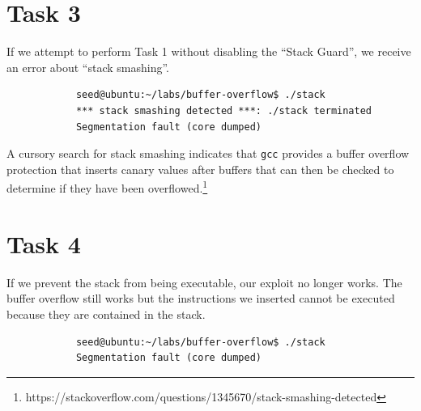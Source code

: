 \documentclass[12pt,letterpaper]{article}
\begin{document}
	\section*{Task 3}
		If we attempt to perform Task 1 without disabling the ``Stack Guard'', we receive an error about ``stack smashing''.
		
		\begin{verbatim}
			seed@ubuntu:~/labs/buffer-overflow$ ./stack 
			*** stack smashing detected ***: ./stack terminated
			Segmentation fault (core dumped)
		\end{verbatim}
		
		A cursory search for stack smashing indicates that \texttt{gcc} provides a buffer overflow protection that inserts canary values after buffers that can then be checked to determine if they have been overflowed.\footnote{https://stackoverflow.com/questions/1345670/stack-smashing-detected}
		
	\section*{Task 4}
		If we prevent the stack from being executable, our exploit no longer works. The buffer overflow still works but the instructions we inserted cannot be executed because they are contained in the stack.
		
		\begin{verbatim}
			seed@ubuntu:~/labs/buffer-overflow$ ./stack 
			Segmentation fault (core dumped)
		\end{verbatim}
\end{document}
